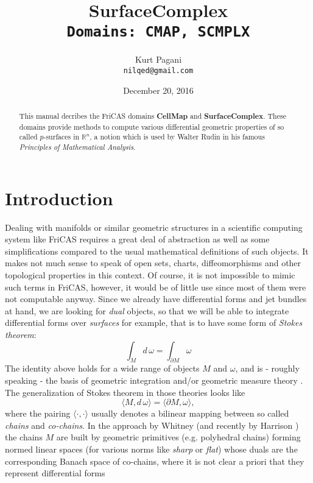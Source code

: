 \documentclass[12pt,a4paper]{article}
\author{Kurt Pagani \\ {\tt nilqed@gmail.com}}
\date{December 20, 2016}
\title{SurfaceComplex \\ {\small\tt Domains: CMAP, SCMPLX}}
\newcommand{\RR}[1]{\mathbb{R}^{#1}}
\begin{document}
\maketitle
%
\begin{abstract}
This manual decribes the FriCAS domains {\bf CellMap} and 
{\bf SurfaceComplex}. These domains provide methods to compute
various differential geometric properties of so called $p$-surfaces
in ${\RR n}$, a notion which is used by Walter Rudin in his famous
{\it Principles of Mathematical Analysis}. 
\end{abstract}
%
\tableofcontents
\section{Introduction}
%
Dealing with manifolds or similar geometric structures in a scientific
computing system like FriCAS requires a great deal of abstraction as well
as some simplifications compared to the usual mathematical definitions of
such objects. It makes not much sense to speak of open sets, charts,
diffeomorphisms and other topological properties in this context. Of 
course, it is not impossible to mimic such terms in FriCAS, however,
it would be of little use since most of them were not computable
anyway. Since we already have differential forms and jet bundles at
hand, we are looking for {\it dual} objects, so that we will be able
to integrate differential forms over {\it surfaces} for example, that
is to have some form of {\em Stokes theorem}:
\begin{displaymath}
  \int_{M} d\,\omega = \int_{\partial M} \omega
\end{displaymath}   
The identity above holds for a wide range of objects $M$ and $\omega$,
and is - roughly speaking - the basis of geometric integration 
\cite{GIT} and/or geometric measure theory \cite{GMT}. The generalization
of Stokes theorem in those theories looks like
\begin{displaymath}
    \langle M,d\, \omega\rangle = \langle \partial M, \omega \rangle,
\end{displaymath}  
where the pairing $\langle\cdot,\cdot\rangle$ usually denotes a bilinear
mapping between so called {\em chains} and {\em co-chains}. In the 
approach \cite{GIT} by Whitney (and recently by Harrison \cite{JH}) the
chains $M$ are built by geometric primitives (e.g. polyhedral chains)
forming normed linear spaces (for various norms like {\em sharp} or
{\em flat}) whose duals are the corresponding Banach space of co-chains,
where it is not clear a priori that they represent differential forms 
\end{document}
